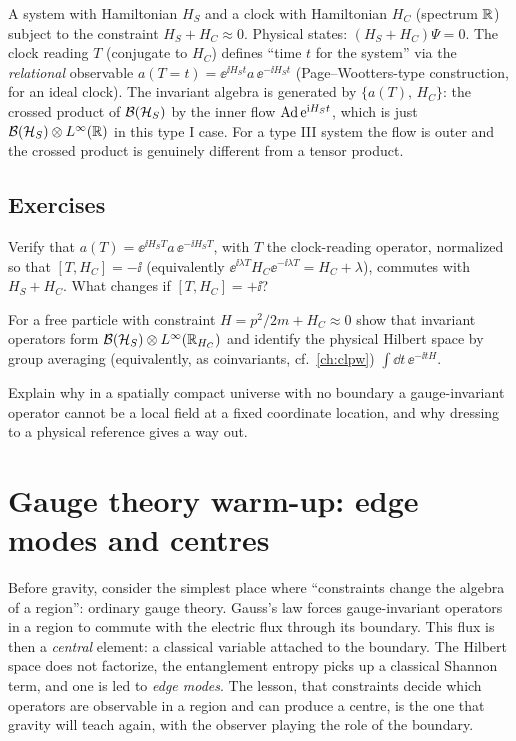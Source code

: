 A system with Hamiltonian $H_S$ and a clock with Hamiltonian $H_C$ (spectrum $\mathbb{R}$) subject to the constraint $H_S+H_C\approx0$. Physical states: $(H_S+H_C)\Psi=0$. The clock reading $T$ (conjugate to $H_C$) defines ``time $t$ for the system'' via the \emph{relational} observable $a(T=t)=\ee^{\ii H_S t}a\,\ee^{-\ii H_St}$ (Page--Wootters-type construction, for an ideal clock). The invariant algebra is generated by $\{a(T),\,H_C\}$: the crossed product of $\mathcal{B}(\mathcal{H}_S)$ by the inner flow $\operatorname{Ad}\mathrm{e}^{\mathrm{i} H_St}$, which is just $\mathcal{B}(\mathcal{H}_S)\otimes L^\infty(\mathbb{R})$ in this type I case. For a type III system the flow is outer and the crossed product is genuinely different from a tensor product.

\subsection*{Exercises}
\begin{exercise}\label{ex:gravity_constraints:1}
Verify that $a(T)=\ee^{\ii H_ST}a\,\ee^{-\ii H_ST}$, with $T$ the clock-reading operator, normalized so that $[T,H_C]=-\ii$ (equivalently $\ee^{\ii\lambda T}H_C\ee^{-\ii\lambda T}=H_C+\lambda$), commutes with $H_S+H_C$. What changes if $[T,H_C]=+\ii$?
\end{exercise}
\begin{exercise}\label{ex:gravity_constraints:2}
For a free particle with constraint $H=p^2/2m+H_C\approx0$ show that invariant operators form $\mathcal{B}(\mathcal{H}_S)\otimes L^\infty(\mathbb{R}_{H_C})$ and identify the physical Hilbert space by group averaging (equivalently, as coinvariants, cf.\ \cref{ch:clpw}) $\int\dd t\,\ee^{-\ii tH}$.
\end{exercise}
\begin{exercise}\label{ex:gravity_constraints:3}
Explain why in a spatially compact universe with no boundary a gauge-invariant operator cannot be a local field at a fixed coordinate location, and why dressing to a physical reference gives a way out.
\end{exercise}

\section{Gauge theory warm-up: edge modes and centres}\label{ch:gauge_warmup}

\begin{physmotiv}
Before gravity, consider the simplest place where ``constraints change the algebra of a region'': ordinary gauge theory. Gauss's law forces gauge-invariant operators in a region to commute with the electric flux through its boundary. This flux is then a \emph{central} element: a classical variable attached to the boundary. The Hilbert space does not factorize, the entanglement entropy picks up a classical Shannon term, and one is led to \emph{edge modes}. The lesson, that constraints decide which operators are observable in a region and can produce a centre, is the one that gravity will teach again, with the observer playing the role of the boundary.
\end{physmotiv}

